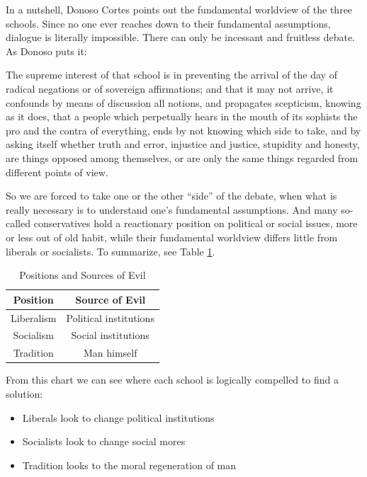 In a nutshell, Donoso Cortes points out the fundamental worldview of the three schools. Since no one ever reaches down to their fundamental assumptions, dialogue is literally impossible. There can only be incessant and fruitless debate. As Donoso puts it:

\begin{quotex}
The supreme interest of that school is in preventing the arrival of the day of radical negations or of sovereign affirmations; and that it may not arrive, it confounds by means of discussion all notions, and propagates scepticism, knowing as it does, that a people which perpetually hears in the mouth of its sophists the pro and the contra of everything, ends by not knowing which side to take, and by asking itself whether truth and error, injustice and justice, stupidity and honesty, are things opposed among themselves, or are only the same things regarded from different points of view.
\end{quotex}


So we are forced to take one or the other ``side'' of the debate, when what is really necessary is to understand one's fundamental assumptions. And many so-called conservatives hold a reactionary position on political or social issues, more or less out of old habit, while their fundamental worldview differs little from liberals or socialists. To summarize, see Table \ref{tab:PositionsSources}.

\begin{table}[h]\small\centering
\begin{tabular}{cc}\toprule

\textbf{Position} & \textbf{Source of Evil} \\\midrule

Liberalism & Political institutions\\ 

Socialism & Social institutions \\

Tradition & Man himself \\\bottomrule
\end{tabular}
\caption{Positions and Sources of Evil}
\label{tab:PositionsSources}
\end{table}

From this chart we can see where each school is logically compelled to find a solution:

\begin{itemize}


\item Liberals look to change political institutions

\item Socialists look to change social mores

\item Tradition looks to the moral regeneration of man
\end{itemize}


